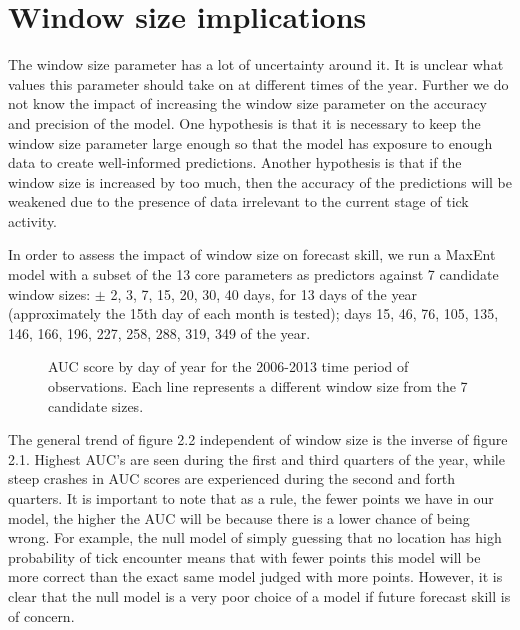 \section{Window size implications }

\noindent The window size parameter has a lot of uncertainty around it. It is unclear what values this parameter should take on at different times of the year. Further we do not know the impact of increasing the window size parameter on the accuracy and precision of the model. One hypothesis is that it is necessary to keep the window size parameter large enough so that the model has exposure to enough data to create well-informed predictions. Another hypothesis is that if the window size is increased by too much, then the accuracy of the predictions will be weakened due to the presence of data irrelevant to the current stage of tick activity. \newline

\noindent In order to assess the impact of window size on forecast skill, we run a MaxEnt model with a subset of the 13 core parameters as predictors against 7 candidate window sizes: $\pm$ 2, 3, 7, 15, 20, 30, 40 days, for 13 days of the year (approximately the 15th day of each month is tested); days 15, 46, 76, 105, 135, 146, 166, 196, 227, 258, 288, 319, 349 of the year. \newline

\begin{figure} [!ht]
\centerline{}
\caption{AUC score by day of year for the 2006-2013 time period of observations. Each line represents a different window size from the 7 candidate sizes. }
\label{fig6}
\end{figure}

\noindent The general trend of figure 2.2 independent of window size is the inverse of figure 2.1. Highest AUC's are seen during the first and third quarters of the year, while steep crashes in AUC scores are experienced during the second and forth quarters. It is important to note that as a rule, the fewer points we have in our model, the higher the AUC will be because there is a lower chance of being wrong. For example, the null model of simply guessing that no location has high probability of tick encounter means that with fewer points this model will be more correct than the exact same model judged with more points. However, it is clear that the null model is a very poor choice of a model if future forecast skill is of concern. \newline

